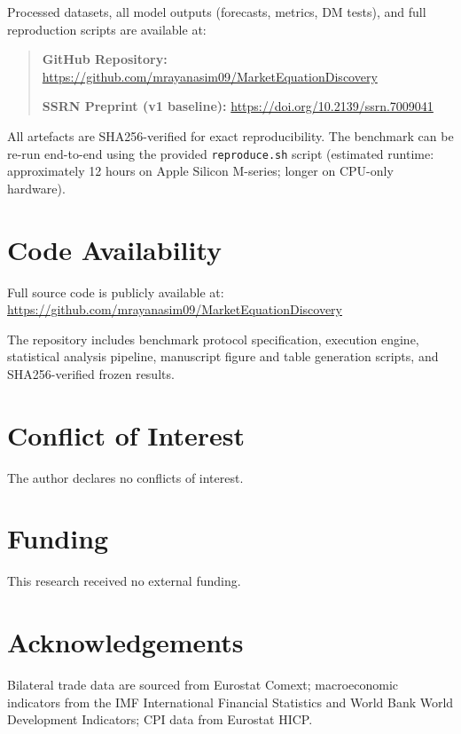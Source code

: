 \documentclass[
  11pt,
  a4paper]{article}
\begin{document}
Processed datasets, all model outputs (forecasts, metrics, DM tests),
and full reproduction scripts are available at:

\begin{quote}
\textbf{GitHub Repository:}
\url{https://github.com/mrayanasim09/MarketEquationDiscovery}

\textbf{SSRN Preprint (v1 baseline):}
\url{https://doi.org/10.2139/ssrn.7009041}
\end{quote}

All artefacts are SHA256-verified for exact reproducibility. The
benchmark can be re-run end-to-end using the provided
\texttt{reproduce.sh} script (estimated runtime: approximately 12 hours
on Apple Silicon M-series; longer on CPU-only hardware).

\section{Code Availability}\label{code-availability}

Full source code is publicly available at:
\url{https://github.com/mrayanasim09/MarketEquationDiscovery}

The repository includes benchmark protocol specification, execution
engine, statistical analysis pipeline, manuscript figure and table
generation scripts, and SHA256-verified frozen results.

\section{Conflict of Interest}\label{conflict-of-interest}

The author declares no conflicts of interest.

\section{Funding}\label{funding}

This research received no external funding.

\section{Acknowledgements}\label{acknowledgements}

Bilateral trade data are sourced from Eurostat Comext; macroeconomic
indicators from the IMF International Financial Statistics and World
Bank World Development Indicators; CPI data from Eurostat HICP.
\end{document}
